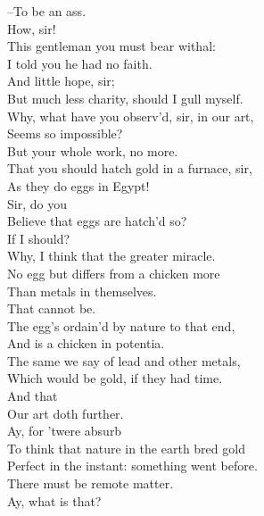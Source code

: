 \documentclass{memoir}
\begin{document}
\begin{drama*}
\surlyspeaks {} --To be an ass.\\
\subtlespeaks  How, sir!\\
\mammonspeaks {} This gentleman you must bear withal:\\
 I told you he had no faith.\\
\surlyspeaks {} And little hope, sir;\\
 But much less charity, should I gull myself.\\
\subtlespeaks  Why, what have you observ'd, sir, in our art,\\
 Seems so impossible?\\
\surlyspeaks {} But your whole work, no more.\\
 That you should hatch gold in a furnace, sir,\\
 As they do eggs in Egypt!\\
\subtlespeaks {} Sir, do you\\
 Believe that eggs are hatch'd so?\\
\surlyspeaks {} If I should?\\
\subtlespeaks  Why, I think that the greater miracle.\\
 No egg but differs from a chicken more\\
 Than metals in themselves.\\
\surlyspeaks {} That cannot be.\\
 The egg's ordain'd by nature to that end,\\
 And is a chicken in potentia.\\
\subtlespeaks  The same we say of lead and other metals,\\
 Which would be gold, if they had time.\\
\mammonspeaks {} And that\\
 Our art doth further.\\
\subtlespeaks {} Ay, for 'twere absurb\\
 To think that nature in the earth bred gold\\
 Perfect in the instant: something went before.\\
 There must be remote matter.\\
\surlyspeaks {} Ay, what is that?\\

\end{drama*}
\end{document}
